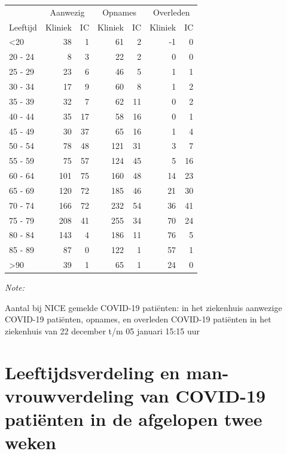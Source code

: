 \documentclass[
  english,
  man,floatsintext]{apa6}
\begin{document}
\begin{table}
\centering\begingroup\fontsize{10}{12}\selectfont

\begin{threeparttable}
\begin{tabular}{lrrrrrr}
\toprule
\multicolumn{1}{c}{ } & \multicolumn{2}{c}{Aanwezig} & \multicolumn{2}{c}{Opnames} & \multicolumn{2}{c}{Overleden} \\
\cmidrule(l{3pt}r{3pt}){2-3} \cmidrule(l{3pt}r{3pt}){4-5} \cmidrule(l{3pt}r{3pt}){6-7}
Leeftijd & Kliniek & IC & Kliniek & IC & Kliniek & IC\\
\midrule
<20 & 38 & 1 & 61 & 2 & -1 & 0\\
20 - 24 & 8 & 3 & 22 & 2 & 0 & 0\\
25 - 29 & 23 & 6 & 46 & 5 & 1 & 1\\
30 - 34 & 17 & 9 & 60 & 8 & 1 & 2\\
35 - 39 & 32 & 7 & 62 & 11 & 0 & 2\\
40 - 44 & 35 & 17 & 58 & 16 & 0 & 1\\
45 - 49 & 30 & 37 & 65 & 16 & 1 & 4\\
50 - 54 & 78 & 48 & 121 & 31 & 3 & 7\\
55 - 59 & 75 & 57 & 124 & 45 & 5 & 16\\
60 - 64 & 101 & 75 & 160 & 48 & 14 & 23\\
65 - 69 & 120 & 72 & 185 & 46 & 21 & 30\\
70 - 74 & 166 & 72 & 232 & 54 & 36 & 41\\
75 - 79 & 208 & 41 & 255 & 34 & 70 & 24\\
80 - 84 & 143 & 4 & 186 & 11 & 76 & 5\\
85 - 89 & 87 & 0 & 122 & 1 & 57 & 1\\
>90 & 39 & 1 & 65 & 1 & 24 & 0\\
\bottomrule
\end{tabular}
\begin{tablenotes}
\item \textit{Note: } 
\item Aantal bij NICE gemelde COVID-19 patiënten: in het ziekenhuis aanwezige COVID-19 patiënten, opnames, en overleden COVID-19 patiënten in het ziekenhuis van 22 december t/m 05 januari 15:15 uur
\end{tablenotes}
\end{threeparttable}
\endgroup{}
\end{table}

\newpage

\hypertarget{leeftijdsverdeling-en-man-vrouwverdeling-van-covid-19-patiuxebnten-in-de-afgelopen-twee-weken}{%
\section{Leeftijdsverdeling en man-vrouwverdeling van COVID-19 patiënten in de afgelopen twee weken}\label{leeftijdsverdeling-en-man-vrouwverdeling-van-covid-19-patiuxebnten-in-de-afgelopen-twee-weken}}
\end{document}

